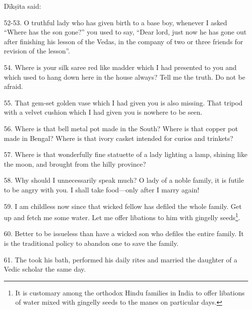 Dīkṣita said:

52-53. O truthful lady who has given birth to a base boy, whenever I asked
“Where has the son gone?” you used to say, “Dear lord, just now he has gone out
after finishing his lesson of the Vedas, in the company of two or three friends
for revision of the lesson”.

54. Where is your silk saree red like madder which I had presented to you and
which used to hang down here in the house always? Tell me the truth. Do not be
afraid.

55. That gem-set golden vase which I had given you is also missing. That tripod
with a velvet cushion which I had given you is nowhere to be seen.

56. Where is that bell metal pot made in the South? Where is that copper pot
made in Bengal? Where is that ivory casket intended for curios and trinkets?

57. Where is that wonderfully fine statuette of a lady lighting a lamp, shining
like the moon, and brought from the hilly province?

58. Why should I unnecessarily speak much? O lady of a noble family, it is
futile to be angry with you. I shall take food—only after I marry again!

59. I am childless now since that wicked fellow has defiled the whole family.
Get up and fetch me some water. Let me offer libations to him with gingelly
seeds\footnote{It is customary among the orthodox Hindu families in India to
offer libations of water mixed with gingelly seeds to the manes on particular
days.}.

60. Better to be issueless than have a wicked son who defiles the entire family.
It is the traditional policy to abandon one to save the family.

61. The  took his bath, performed his daily rites and married
the daughter of a Vedic scholar the same day.
